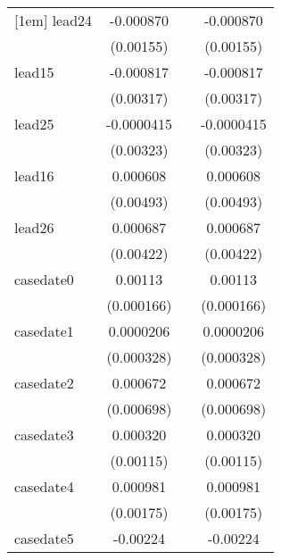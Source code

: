 {\begin{tabular}{l*{3}{c}}
[1em]
lead24      &   -0.000870         &                     &   -0.000870         \\
            &   (0.00155)         &                     &   (0.00155)         \\
[1em]
lead15      &   -0.000817         &                     &   -0.000817         \\
            &   (0.00317)         &                     &   (0.00317)         \\
[1em]
lead25      &  -0.0000415         &                     &  -0.0000415         \\
            &   (0.00323)         &                     &   (0.00323)         \\
[1em]
lead16      &    0.000608         &                     &    0.000608         \\
            &   (0.00493)         &                     &   (0.00493)         \\
[1em]
lead26      &    0.000687         &                     &    0.000687         \\
            &   (0.00422)         &                     &   (0.00422)         \\
[1em]
casedate0   &     0.00113\sym{***}&                     &     0.00113\sym{***}\\
            &  (0.000166)         &                     &  (0.000166)         \\
[1em]
casedate1   &   0.0000206         &                     &   0.0000206         \\
            &  (0.000328)         &                     &  (0.000328)         \\
[1em]
casedate2   &    0.000672         &                     &    0.000672         \\
            &  (0.000698)         &                     &  (0.000698)         \\
[1em]
casedate3   &    0.000320         &                     &    0.000320         \\
            &   (0.00115)         &                     &   (0.00115)         \\
[1em]
casedate4   &    0.000981         &                     &    0.000981         \\
            &   (0.00175)         &                     &   (0.00175)         \\
[1em]
casedate5   &    -0.00224         &                     &    -0.00224         \\

\end{tabular}}
